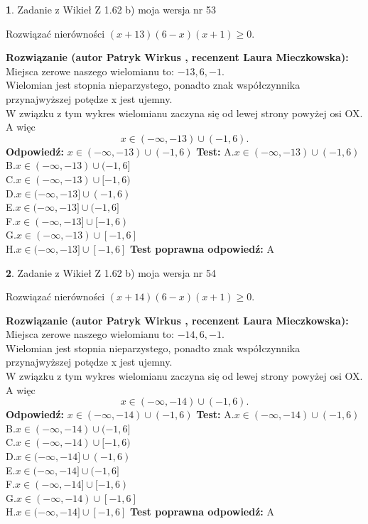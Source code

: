 \documentclass[12pt, a4paper]{article}
\theoremstyle{definition} %
\newtheorem{zad}{}
\newcommand{\zadStart}[1]{\begin{zad}#1\newline}
\newcommand{\zadStop}{\end{zad}}
\newcommand{\rozwStart}[2]{\noindent \textbf{Rozwiązanie (autor #1 , recenzent #2): }\newline}
\newcommand{\rozwStop}{\newline}
\newcommand{\odpStart}{\noindent \textbf{Odpowiedź:}\newline}
\newcommand{\odpStop}{\newline}
\newcommand{\testStart}{\noindent \textbf{Test:}\newline}
\newcommand{\testStop}{\newline}
\newcommand{\kluczStart}{\noindent \textbf{Test poprawna odpowiedź:}\newline}
\newcommand{\kluczStop}{\newline}
\begin{document}
\zadStart{Zadanie z Wikieł Z 1.62 b) moja wersja nr 53}

Rozwiązać nierówności $(x+13)(6-x)(x+1)\ge0$.
\zadStop
\rozwStart{Patryk Wirkus}{Laura Mieczkowska}
Miejsca zerowe naszego wielomianu to: $-13, 6, -1$.\\
Wielomian jest stopnia nieparzystego, ponadto znak współczynnika przy\linebreak najwyższej potędze x jest ujemny.\\ W związku z tym wykres wielomianu zaczyna się od lewej strony powyżej osi OX. A więc $$x \in (-\infty,-13) \cup (-1,6).$$
\rozwStop
\odpStart
$x \in (-\infty,-13) \cup (-1,6)$
\odpStop
\testStart
A.$x \in (-\infty,-13) \cup (-1,6)$\\
B.$x \in (-\infty,-13) \cup (-1,6]$\\
C.$x \in (-\infty,-13) \cup [-1,6)$\\
D.$x \in (-\infty,-13] \cup (-1,6)$\\
E.$x \in (-\infty,-13] \cup (-1,6]$\\
F.$x \in (-\infty,-13] \cup [-1,6)$\\
G.$x \in (-\infty,-13) \cup [-1,6]$\\
H.$x \in (-\infty,-13] \cup [-1,6]$
\testStop
\kluczStart
A
\kluczStop



\zadStart{Zadanie z Wikieł Z 1.62 b) moja wersja nr 54}

Rozwiązać nierówności $(x+14)(6-x)(x+1)\ge0$.
\zadStop
\rozwStart{Patryk Wirkus}{Laura Mieczkowska}
Miejsca zerowe naszego wielomianu to: $-14, 6, -1$.\\
Wielomian jest stopnia nieparzystego, ponadto znak współczynnika przy\linebreak najwyższej potędze x jest ujemny.\\ W związku z tym wykres wielomianu zaczyna się od lewej strony powyżej osi OX. A więc $$x \in (-\infty,-14) \cup (-1,6).$$
\rozwStop
\odpStart
$x \in (-\infty,-14) \cup (-1,6)$
\odpStop
\testStart
A.$x \in (-\infty,-14) \cup (-1,6)$\\
B.$x \in (-\infty,-14) \cup (-1,6]$\\
C.$x \in (-\infty,-14) \cup [-1,6)$\\
D.$x \in (-\infty,-14] \cup (-1,6)$\\
E.$x \in (-\infty,-14] \cup (-1,6]$\\
F.$x \in (-\infty,-14] \cup [-1,6)$\\
G.$x \in (-\infty,-14) \cup [-1,6]$\\
H.$x \in (-\infty,-14] \cup [-1,6]$
\testStop
\kluczStart
A
\kluczStop
\end{document}
